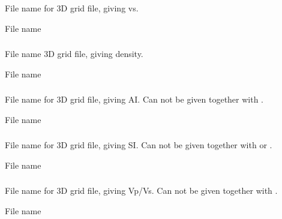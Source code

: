 \subsubsection{}
 \slist
   \item \Description File name for 3D grid file, giving vs.
   \item \Argument File name
   \item \Default
 \elist

\subsubsection{}
 \slist
   \item \Description File name 3D grid file, giving density.
   \item \Argument File name
   \item \Default
 \elist

\subsubsection{}
 \slist
   \item \Description File name for 3D grid file, giving AI. Can not
     be given together with  .
   \item \Argument File name
   \item \Default
 \elist

\subsubsection{}
 \slist
   \item \Description File name for 3D grid file, giving SI. Can not
   be given together with  or .
   \item \Argument File name
   \item \Default
 \elist

\subsubsection{}
 \slist
   \item \Description File name for 3D grid file, giving Vp/Vs. Can
   not be given together with .
   \item \Argument File name
   \item \Default
 \elist

